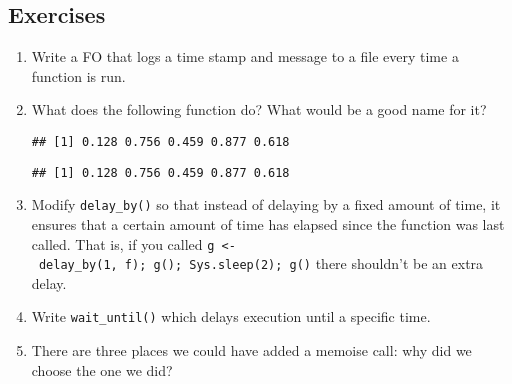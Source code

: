 \hypertarget{exercises}{%
\subsection{Exercises}\label{exercises}}

\begin{enumerate}
\def\labelenumi{\arabic{enumi}.}
\item
  Write a FO that logs a time stamp and message to a file every time a
  function is run.
\item
  What does the following function do? What would be a good name for it?

\begin{Shaded}
\begin{Highlighting}[]
\StringTok{ }
\StringTok{ }
    \NormalTok{ (}
\StringTok{ }
\NormalTok{    \}}
\NormalTok{  \}}
\NormalTok{\}}
\StringTok{ }
\NormalTok{(}\NormalTok{)}
\end{Highlighting}
\end{Shaded}

\begin{verbatim}
## [1] 0.128 0.756 0.459 0.877 0.618
\end{verbatim}

\begin{Shaded}
\begin{Highlighting}[]
\NormalTok{(}\NormalTok{)}
\end{Highlighting}
\end{Shaded}

\begin{verbatim}
## [1] 0.128 0.756 0.459 0.877 0.618
\end{verbatim}
\item
  Modify \texttt{delay\_by()} so that instead of delaying by a fixed
  amount of time, it ensures that a certain amount of time has elapsed
  since the function was last called. That is, if you called
  \texttt{g\ \textless{}-\ delay\_by(1,\ f);\ g();\ Sys.sleep(2);\ g()}
  there shouldn't be an extra delay.
\item
  Write \texttt{wait\_until()} which delays execution until a specific
  time.
\item
  There are three places we could have added a memoise call: why did we
  choose the one we did?


\end{enumerate}
